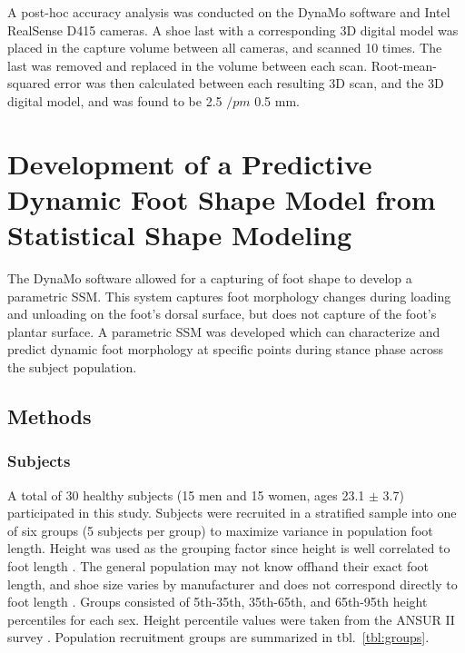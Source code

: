 \documentclass[defaultstyle,11pt]{thesis}
\begin{document}
A post-hoc accuracy analysis was conducted on the DynaMo software and Intel RealSense D415 cameras.
A shoe last with a corresponding 3D digital model was placed in the capture volume between all cameras, and scanned 10 times.
The last was removed and replaced in the volume between each scan.
Root-mean-squared error was then calculated between each resulting 3D scan, and the 3D digital model, and was found to be 2.5 \(/pm\) 0.5 mm.

\hypertarget{development-of-a-predictive-dynamic-foot-shape-model-from-statistical-shape-modeling}{%
\section{Development of a Predictive Dynamic Foot Shape Model from Statistical Shape Modeling}\label{development-of-a-predictive-dynamic-foot-shape-model-from-statistical-shape-modeling}}

The DynaMo software \citep{Boppana2019} allowed for a capturing of foot shape to develop a parametric SSM.
This system captures foot morphology changes during loading and unloading on the foot's dorsal surface, but does not capture of the foot's plantar surface.
A parametric SSM was developed which can characterize and predict dynamic foot morphology at specific points during stance phase across the subject population.

\hypertarget{methods-1}{%
\subsection{Methods}\label{methods-1}}

\hypertarget{subjects}{%
\subsubsection{Subjects}\label{subjects}}

A total of 30 healthy subjects (15 men and 15 women, ages 23.1 \(\pm\) 3.7) participated in this study.
Subjects were recruited in a stratified sample into one of six groups (5 subjects per group) to maximize variance in population foot length.
Height was used as the grouping factor since height is well correlated to foot length \citep{Giles1991}. The general population may not know offhand their exact foot length, and shoe size varies by manufacturer and does not correspond directly to foot length \citep{Jurca2013, Wannop2019}. Groups consisted of 5th-35th, 35th-65th, and 65th-95th height percentiles for each sex.
Height percentile values were taken from the ANSUR II survey \citep{Gordon2014}.
Population recruitment groups are summarized in tbl.~\ref{tbl:groups}.
\end{document}
